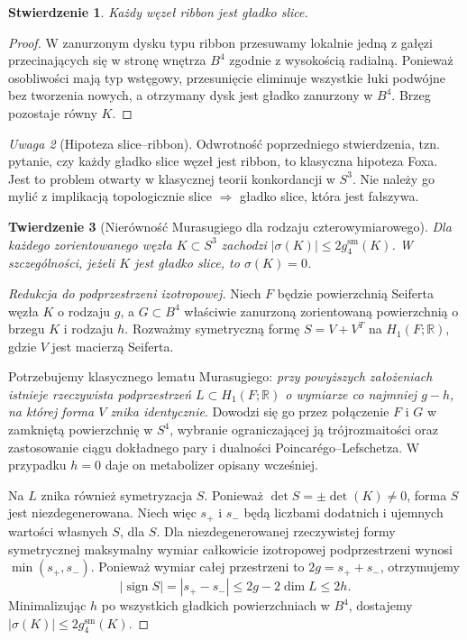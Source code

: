 \documentclass[11pt,a4paper]{report}
\numberwithin{equation}{section}
\theoremstyle{plain}
\newtheorem{twierdzenie}{Twierdzenie}[section]
\newtheorem{stwierdzenie}[twierdzenie]{Stwierdzenie}
\theoremstyle{definition}
\theoremstyle{remark}
\newtheorem{uwaga}[twierdzenie]{Uwaga}
\begin{document}
\begin{stwierdzenie}
Każdy węzeł ribbon jest gładko slice.
\end{stwierdzenie}

\begin{proof}
W zanurzonym dysku typu ribbon przesuwamy lokalnie jedną z gałęzi
przecinających się w stronę wnętrza $B^4$ zgodnie
z wysokością radialną. Ponieważ osobliwości mają typ wstęgowy,
przesunięcie eliminuje wszystkie łuki podwójne bez tworzenia
nowych, a otrzymany dysk jest gładko zanurzony w $B^4$.
Brzeg pozostaje równy $K$.
\end{proof}

\begin{uwaga}[Hipoteza slice--ribbon]
Odwrotność poprzedniego stwierdzenia, tzn. pytanie,
czy każdy gładko slice węzeł jest ribbon, to klasyczna
hipoteza Foxa. Jest to problem otwarty w klasycznej
teorii konkordancji w $S^3$.
Nie należy go mylić z implikacją topologicznie slice
$\Rightarrow$ gładko slice, która jest fałszywa.
\end{uwaga}

\begin{twierdzenie}[Nierówność Murasugiego dla rodzaju czterowymiarowego]
Dla każdego zorientowanego węzła $K\subset S^3$
zachodzi $|\sigma(K)|\leq2g_4^{\mathrm{sm}}(K)$.
W szczególności, jeżeli $K$ jest gładko slice, to
$\sigma(K)=0$.
\end{twierdzenie}

\begin{proof}[Redukcja do podprzestrzeni izotropowej]
Niech $F$ będzie powierzchnią Seiferta węzła $K$ o
rodzaju $g$, a $G\subset B^4$ właściwie zanurzoną
zorientowaną powierzchnią o brzegu $K$ i rodzaju $h$.
Rozważmy symetryczną formę $S=V+V^T$ na
$H_1(F;\mathbb R)$, gdzie $V$ jest macierzą Seiferta.

Potrzebujemy klasycznego lematu Murasugiego:
\emph{przy powyższych założeniach istnieje rzeczywista
podprzestrzeń $L\subset H_1(F;\mathbb R)$
o wymiarze co najmniej $g-h$, na której forma $V$
znika identycznie}. Dowodzi się go przez połączenie
$F$ i $G$ w zamkniętą powierzchnię w $S^4$, wybranie
ograniczającej ją trójrozmaitości oraz zastosowanie
ciągu dokładnego pary i dualności Poincarégo--Lefschetza.
W przypadku $h=0$ daje on metabolizer opisany wcześniej.

Na $L$ znika również symetryzacja $S$. Ponieważ
$\det S=\pm\det(K)\ne0$, forma $S$ jest niezdegenerowana. Niech więc
$s_+$ i $s_-$ będą liczbami dodatnich i ujemnych wartości
własnych $S$, dla $S$. Dla niezdegenerowanej rzeczywistej formy symetrycznej
maksymalny wymiar całkowicie izotropowej
podprzestrzeni wynosi $\min(s_+,s_-)$. Ponieważ
wymiar całej przestrzeni to $2g=s_++s_-$, otrzymujemy
\[
|\operatorname{sign}S|=|s_+-s_-|
\le 2g-2\dim L\le2h.
\]
Minimalizując $h$ po wszystkich gładkich powierzchniach
w $B^4$, dostajemy $|\sigma(K)|\le2g_4^{\mathrm{sm}}(K)$.
\end{proof}
\end{document}
